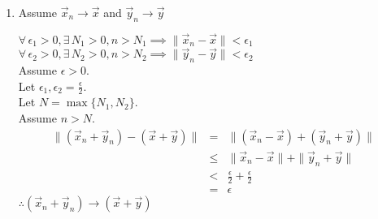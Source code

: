 \documentclass[letterpaper,12pt,fleqn]{article}
\newcommand{\e}{\epsilon}
\newcommand{\norm}[1]{\|#1\|}
\newcommand{\vx}{\vec{x}}
\newcommand{\vy}{\vec{y}}
\begin{document}
\begin{theproof}
\begin{enumerate}
  \item Assume $\vx_n\to\vx$ and $\vy_n\to\vy$

    $\forall\,\e_1>0,\exists\,N_1>0,n>N_1\implies\norm{\vx_n-\vx}<\e_1$ \\
    $\forall\,\e_2>0,\exists\,N_2>0,n>N_2\implies\norm{\vy_n-\vy}<\e_2$ \\
    Assume $\e>0$. \\
    Let $\e_1,\e_2=\frac{\e}{2}$. \\
    Let $N=\max\{N_1,N_2\}$. \\
    Assume $n>N$.
    \begin{eqnarray*}
      \norm{(\vx_n+\vy_n)-(\vx+\vy)} &=& \norm{(\vx_n-\vx)+(\vy_n+\vy)} \\
      &\le& \norm{\vx_n-\vx}+\norm{\vy_n+\vy} \\
      &<& \frac{\e}{2}+\frac{\e}{2} \\
      &=& \e
    \end{eqnarray*}
    $\therefore(\vx_n+\vy_n)\to(\vx+\vy)$
  \end{enumerate}
\end{theproof}
\end{document}
